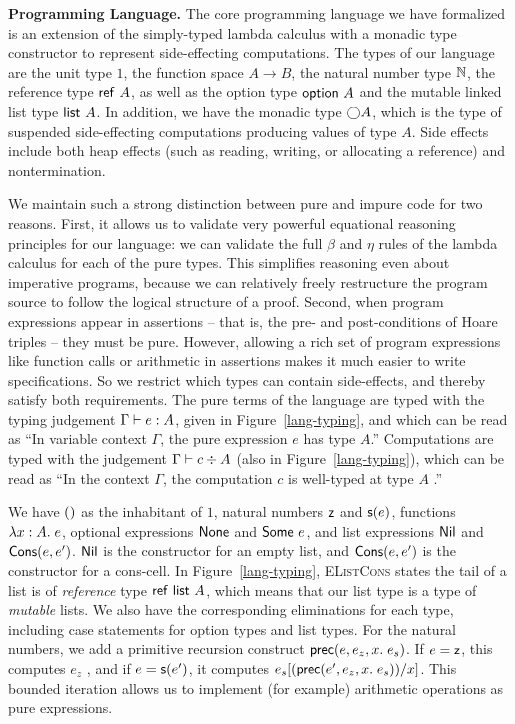 \documentclass[preprint,natbib]{sigplanconf}
\begin{document}
\textbf{Programming Language.} The core programming language we have
formalized is an extension of the simply-typed lambda calculus with a
monadic type constructor to represent side-effecting computations.
The types of our language are the unit type $1$, the function space $A
\to B$, the natural number type $\mathbb{N}$, the reference type
$\mbox{\textsf{{ref }}}A$, as well as the option type $\mbox{\textsf{{option }}}{A}$ and the
mutable linked list type $\mbox{\textsf{{list }}}{A}$. In addition, we have the
monadic type $\bigcirc{A}$, which is the type of suspended
side-effecting computations producing values of type $A$. Side effects
include both heap effects (such as reading, writing, or allocating a
reference) and nontermination.

We maintain such a strong distinction between pure and impure code for
two reasons. First, it allows us to validate very powerful equational
reasoning principles for our language: we can validate the full
$\beta$ and $\eta$ rules of the lambda calculus for each of the pure
types. This simplifies reasoning even about imperative programs,
because we can relatively freely restructure the program source to
follow the logical structure of a proof. Second, when program
expressions appear in assertions -- that is, the pre- and
post-conditions of Hoare triples -- they must be pure. However,
allowing a rich set of program expressions like function calls or
arithmetic in assertions makes it much easier to write
specifications. So we restrict which types can contain side-effects,
and thereby satisfy both requirements.
%
The pure terms of the language are typed with the typing judgement
${\Gamma} \vdash {e} : {A}$, given in Figure~\ref{lang-typing}, and which
can be read as ``In variable context $\Gamma$, the pure expression $e$
has type $A$.'' Computations are typed with the judgement
${\Gamma} \vdash {c} \div {A}$ (also in Figure~\ref{lang-typing}), which can
be read as ``In the context $\Gamma$, the computation $c$ is
well-typed at type $A$ .''

We have $()$ as the inhabitant of $1$, natural numbers $\mbox{\textsf{{z}}}$ and
$\mbox{\textsf{{s}}}(e)$, functions $\lambda x:A.\;e$, optional expressions
$\mbox{\textsf{{None}}}$ and $\mbox{\textsf{{Some }}}e$, and list expressions
$\mbox{\textsf{{Nil}}}$ and $\mbox{\textsf{{Cons}}}(e,e')$. $\mbox{\textsf{{Nil}}}$ is the
constructor for an empty list, and $\mbox{\textsf{{Cons}}}(e, e')$ is the
constructor for a cons-cell.  In Figure~\ref{lang-typing},
\textsc{EListCons} states the tail of a list is of \emph{reference} type
$\mbox{\textsf{{ref }}}\mbox{\textsf{{list }}}{A}$, which means that our list type is a type of
\emph{mutable} lists. We also have the corresponding eliminations for
each type, including case statements for option types and list
types. For the natural numbers, we add a primitive recursion construct
$\mbox{\textsf{{prec}}}(e, {e_z}, x.\; {e_s})$. If $e = \mbox{\textsf{{z}}}$, this computes $e_z$ , and if $e
= \mbox{\textsf{{s}}}(e')$, it computes $e_s[(\mbox{\textsf{{prec}}}(e', {e_z}, x.\; {e_s}))/x]$.  This
bounded iteration allows us to implement (for example) arithmetic
operations as pure expressions.
\end{document}
